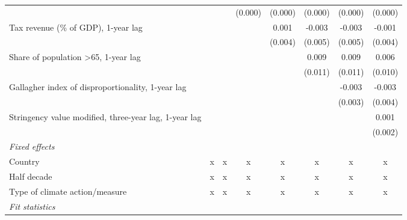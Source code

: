 \begin{table}[htbp]
\begin{tabular}{lccccccc}
                                                                       &               &              & (0.000)       & (0.000)     & (0.000) & (0.000) & (0.000)\\   
      Tax revenue (\% of GDP), 1-year lag                              &               &              &               & 0.001       & -0.003  & -0.003  & -0.001\\   
                                                                       &               &              &               & (0.004)     & (0.005) & (0.005) & (0.004)\\   
      Share of population >65, 1-year lag                              &               &              &               &             & 0.009   & 0.009   & 0.006\\   
                                                                       &               &              &               &             & (0.011) & (0.011) & (0.010)\\   
      Gallagher index of disproportionality, 1-year lag                &               &              &               &             &         & -0.003  & -0.003\\   
                                                                       &               &              &               &             &         & (0.003) & (0.004)\\   
      Stringency value modified, three-year lag, 1-year lag            &               &              &               &             &         &         & 0.001\\   
                                                                       &               &              &               &             &         &         & (0.002)\\   
      \emph{Fixed effects}\\
      Country                                                          & x             & x            & x             & x           & x       & x       & x\\  
      Half decade                                                      & x             & x            & x             & x           & x       & x       & x\\  
      Type of climate action/measure                                   & x             & x            & x             & x           & x       & x       & x\\  
      \midrule \emph{Fit statistics}\\

\end{tabular}
\end{table}
